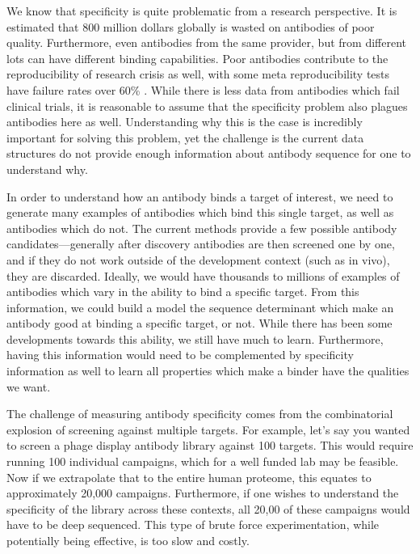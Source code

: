 
We know that specificity is quite problematic from a research perspective. It is estimated that 800 million dollars globally is wasted on antibodies of poor quality\cite{Bradbury2015-hm}. Furthermore, even antibodies from the same provider, but from different lots can have different binding capabilities\cite{Bradbury2015-hm,Weller2016-xv}. Poor antibodies contribute to the reproducibility of research crisis as well\cite{Mechetner2011-cm,Herrera2013-wm}, with some meta reproducibility tests have failure rates over 60\% \cite{Begley2012-kg}. While there is less data from antibodies which fail clinical trials, it is reasonable to assume that the specificity problem also plagues antibodies here as well. Understanding why this is the case is incredibly important for solving this problem, yet the challenge is the current data structures do not provide enough information about antibody sequence for one to understand why. 

In order to understand how an antibody binds a target of interest, we need to generate many examples of antibodies which bind this single target, as well as antibodies which do not. The current methods provide a few possible antibody candidates---generally after discovery antibodies are then screened one by one, and if they do not work outside of the development context (such as in vivo), they are discarded. Ideally, we would have thousands to millions of examples of antibodies which vary in the ability to bind a specific target. From this information, we could build a model the sequence determinant which make an antibody good at binding a specific target, or not. While there has been some developments towards this ability\cite{Kowalsky2015-ip}, we still have much to learn. Furthermore, having this information would need to be complemented by specificity information as well to learn all properties which make a binder have the qualities we want. 

The challenge of measuring antibody specificity comes from the combinatorial explosion of screening against multiple targets. For example, let's say you wanted to screen a phage display antibody library against 100 targets. This would require running 100 individual campaigns, which for a well funded lab may be feasible. Now if we extrapolate that to the entire human proteome, this equates to approximately 20,000 campaigns. Furthermore, if one wishes to understand the specificity of the library across these contexts, all 20,00 of these campaigns would have to be deep sequenced. This type of brute force experimentation, while potentially being effective, is too slow and costly. 

